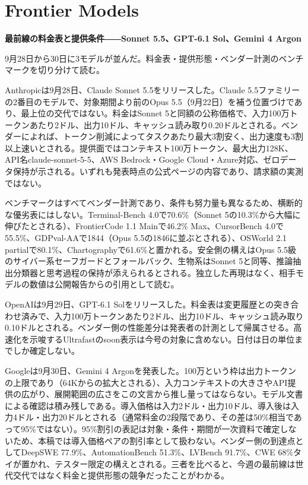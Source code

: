 \section{Frontier Models}
\begin{wideflow}
{\Large\bfseries 最前線の料金表と提供条件――Sonnet 5.5、GPT-6.1 Sol、Gemini 4 Argon}\par
\smallskip
{\color{SurveyMuted}9月28日から30日に3モデルが並んだ。料金表・提供形態・ベンダー計測のベンチマークを切り分けて読む。}\par
\end{wideflow}

Anthropicは9月28日、Claude Sonnet 5.5をリリースした\cite{sonnet55}。Claude 5.5ファミリーの2番目のモデルで、対象期間より前のOpus 5.5（9月22日）を補う位置づけであり、最上位の交代ではない。料金はSonnet 5と同額の公称価格で、入力100万トークンあたり2ドル、出力10ドル、キャッシュ読み取り0.20ドルとされる。ベンダーによれば、トークン削減によってタスクあたり最大3割安く、出力速度も3割以上速いとされる。提供面ではコンテキスト100万トークン、最大出力128K、API名claude-sonnet-5-5、AWS Bedrock・Google Cloud・Azure対応、ゼロデータ保持が示される。いずれも発表時点の公式ページの内容であり、請求額の実測ではない。

ベンチマークはすべてベンダー計測であり、条件も努力量も異なるため、横断的な優劣表にはしない。Terminal-Bench 4.0で70.6\%（Sonnet 5の10.3\%から大幅に伸びたとされる）、FrontierCode 1.1 Mainで46.2\% Max、CursorBench 4.0で55.5\%、GDPval-AAで1844（Opus 5.5の1846に並ぶとされる）、OSWorld 2.1 partialで80.1\%、Chartographyで61.6\%と置かれる。安全側の構えはOpus 5.5級のサイバー系セーフガードとフォールバック、生物系はSonnet 5と同等、推論抽出分類器と思考過程の保持が添えられるとされる。独立した再現はなく、相手モデルの数値は公開報告からの引用として読む。

OpenAIは9月29日、GPT-6.1 Solをリリースした\cite{gpt61sol}。料金表は変更履歴との突き合わせ済みで、入力100万トークンあたり2ドル、出力10ドル、キャッシュ読み取り0.10ドルとされる。ベンダー側の性能差分は発表者の計測として帰属させる。高速化を示唆するUltrafastのsoon表示は今号の対象に含めない。日付は日の単位までしか確定しない。

Googleは9月30日、Gemini 4 Argonを発表した\cite{geminiargon}。100万という枠は出力トークンの上限であり（64Kからの拡大とされる）、入力コンテキストの大きさやAPI提供の広がり、展開範囲の広さをこの文言から推し量ってはならない。モデル文書による確認は積み残しである。導入価格は入力2ドル・出力10ドル、導入後は入力4ドル・出力20ドルとされる（通常料金の2段階であり、その差は50\%相当であって95\%ではない）。95\%割引の表記は対象・条件・期間が一次資料で確定しないため、本稿では導入価格ペアの割引率として扱わない。ベンダー側の到達点としてDeepSWE 77.9\%、AutomationBench 51.3\%、LVBench 91.7\%、CWE 68\%タイが置かれ、テスター限定の構えとされる。三者を比べると、今週の最前線は世代交代ではなく料金と提供形態の競争だったことがわかる。

